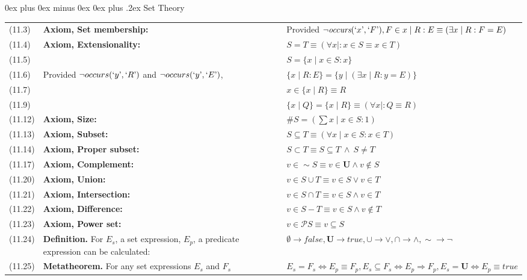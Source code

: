 \documentclass[letterpaper, 8pt]{extarticle}
\makeatletter
\renewcommand{\subsection}{\@startsection{subsection}{2}{0mm}%
                                {0ex plus 0ex minus 0ex}%
                                {0ex plus .2ex}%
                                {\normalfont\small\bfseries}}
\newcommand{\To}{\Rightarrow}
\makeatother
\begin{document}
\begin{multicols*}{3}
    \subsection{Set Theory}
    \begin{tabulary}{\linewidth}{@{}lLL@{}}
        (11.3) & \textbf{Axiom, Set membership:} & Provided $\neg \textit{occurs}(`x\textrm', `F\textrm'), F \in {x \mid R : E} \equiv (\exists x \mid R : F = E)$ \\
        (11.4) & \textbf{Axiom, Extensionality:} & $S = T \equiv (\forall x \mid : x \in S \equiv x \in T)$ \\
        (11.5) & & $S = \{ x \mid x \in S : x \}$ \\
        (11.6) & Provided $\neg occurs(`y\textrm', `R\textrm')$ and $\neg occurs(`y\textrm', `E\textrm')$, & $\{ x \mid R : E \} = \{y \mid (\exists x \mid R : y = E)\}$ \\
        (11.7) & & $x \in \{x \mid R \} \equiv R$ \\
        (11.9) & & $\{x \mid Q \} = \{x \mid R \} \equiv (\forall x \mid : Q \equiv R)$ \\
        (11.12) & \textbf{Axiom, Size:} & $\#S = (\sum x \mid x \in S : 1)$ \\
        (11.13) & \textbf{Axiom, Subset:} & $S \subseteq T \equiv (\forall x \mid x \in S : x \in T)$ \\
        (11.14) & \textbf{Axiom, Proper subset:} & $S \subset T \equiv S \subseteq T \ \land \ S \neq T$ \\
        (11.17) & \textbf{Axiom, Complement:} & $v \in \sim S \equiv v \in \mathbf{U} \land v \not\in S$ \\
        (11.20) & \textbf{Axiom, Union:} & $v \in S \cup T \equiv v \in S \lor v \in T$ \\
        (11.21) & \textbf{Axiom, Intersection:} & $v \in S \cap T \equiv v \in S \land v \in T$ \\
        (11.22) & \textbf{Axiom, Difference:} & $v \in S - T \equiv v \in S \land v \not\in T$ \\
        (11.23) & \textbf{Axiom, Power set:} & $v \in \mathcal{P} S \equiv v \subseteq S$ \\
        (11.24) & \textbf{Definition.} For $E_s$, a set expression, $E_p$, a predicate expression can be calculated: & $\emptyset \to false, \mathbf{U} \to true, \cup \to \lor, \cap \to \land, \sim \to \neg$ \\
        (11.25) & \textbf{Metatheorem.} For any set expressions $E_s$ and $F_s$ & $E_s = F_s \Leftrightarrow E_p \equiv F_p, E_s \subseteq F_s \Leftrightarrow E_p \To F_p, E_s = \mathbf{U} \Leftrightarrow E_p \equiv true$ \\
    \end{tabulary}

\end{multicols*}
\end{document}
